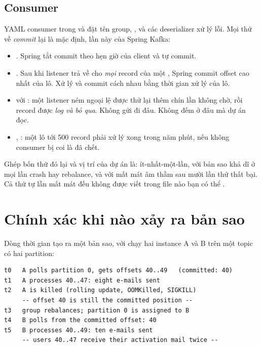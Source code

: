 \subsection{Consumer}

YAML consumer trong  và
 đặt tên group, , và các deserializer xử lý lỗi. Mọi thứ về \emph{commit} lại
là mặc định, lần này của Spring Kafka:

\begin{itemize}
  \item {}. Spring tắt commit theo hẹn giờ
  của client và tự commit.
  \item {}. Sau khi listener trả về cho \emph{mọi}
  record của một , Spring commit offset cao nhất của lô.
  Xử lý và commit cách nhau bằng thời gian xử lý của lô.
  \item {} với : một
  listener ném ngoại lệ được thử lại thêm chín lần không chờ, rồi
  record được \emph{log và bỏ qua}. Không gửi đi đâu. Không đếm ở đâu
  mà dự án đọc.
  \item {}, :
  một lô tới 500 record phải xử lý xong trong năm phút, nếu không
  consumer bị coi là đã chết.
\end{itemize}

Ghép bốn thứ đó lại và vị trí của dự án là: ít-nhất-một-lần, với bản
sao khả dĩ ở mọi lần crash hay rebalance, và với mất mát âm thầm sau
mười lần thử thất bại. Cả thứ tự lẫn mất mát đều không được viết trong
file nào bạn có thể .

\section{Chính xác khi nào xảy ra bản sao}

Dòng thời gian tạo ra một bản sao, với  chạy
hai instance A và B trên một topic có hai partition:

\begin{lstlisting}
t0   A polls partition 0, gets offsets 40..49   (committed: 40)
t1   A processes 40..47: eight e-mails sent
t2   A is killed (rolling update, OOMKilled, SIGKILL)
     -- offset 40 is still the committed position --
t3   group rebalances; partition 0 is assigned to B
t4   B polls from the committed offset: 40
t5   B processes 40..49: ten e-mails sent
     -- users 40..47 receive their activation mail twice --
\end{lstlisting}

